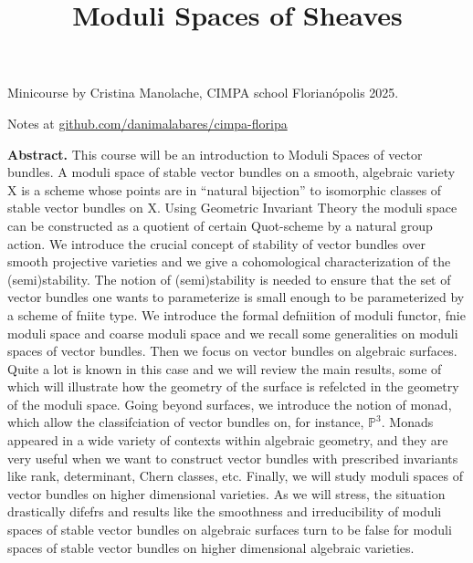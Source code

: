


\title{Moduli Spaces of Sheaves}
\maketitle

Minicourse by Cristina Manolache, CIMPA school Florianópolis 2025.

Notes at 
\href{http://github.com/danimalabares/cimpa-floripa}{github.com/danimalabares/cimpa-floripa}

\bigskip\noindent

{\bf Abstract.} This course will be an introduction to Moduli Spaces of vector
bundles. A moduli space of stable vector bundles on a smooth, algebraic variety
X is a scheme whose points are in “natural bijection” to isomorphic classes of
stable vector bundles on X. Using Geometric Invariant Theory the moduli space
can be constructed as a quotient of certain Quot-scheme by a natural group
action. We introduce the crucial concept of stability of vector bundles over
smooth projective varieties and we give a cohomological characterization of the
(semi)stability. The notion of (semi)stability is needed to ensure that the set
of vector bundles one wants to parameterize is small enough to be parameterized
by a scheme of fniite type. We introduce the formal defniition of moduli
functor, fnie moduli space and coarse moduli space and we recall some
generalities on moduli spaces of vector bundles. Then we focus on vector bundles
on algebraic surfaces. Quite a lot is known in this case and we will review the
main results, some of which will illustrate how the geometry of the surface is
refelcted in the geometry of the moduli space. Going beyond surfaces, we
introduce the notion of monad, which allow the classifciation of vector bundles
on, for instance, $\mathbb{P}^3$. Monads appeared in a wide variety of contexts
within algebraic geometry, and they are very useful when we want to construct
vector bundles with prescribed invariants like rank, determinant, Chern classes,
etc.  Finally, we will study moduli spaces of vector bundles on higher
dimensional varieties. As we will stress, the situation drastically difefrs and
results like the smoothness and irreducibility of moduli spaces of stable vector
bundles on algebraic surfaces turn to be false for moduli spaces of stable
vector bundles on higher dimensional algebraic varieties.  

\bigskip\noindent
\tableofcontents

\bigskip\noindent

